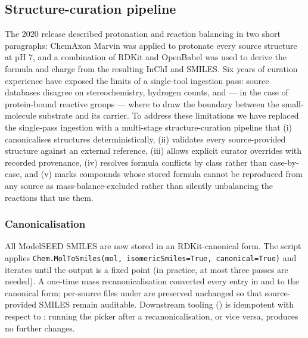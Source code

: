 \subsection{Structure-curation pipeline}\label{sec:structure-curation}

The 2020 release described protonation and reaction balancing in two short
paragraphs: ChemAxon Marvin was applied to protonate every source structure at
pH 7, and a combination of RDKit and OpenBabel was used to derive the formula
and charge from the resulting InChI and SMILES. Six years of curation
experience have exposed the limits of a single-tool ingestion pass: source
databases disagree on stereochemistry, hydrogen counts, and --- in the case of
protein-bound reactive groups --- where to draw the boundary between the
small-molecule substrate and its carrier. To address these limitations we have
replaced the single-pass ingestion with a multi-stage structure-curation
pipeline that (i) canonicalises structures deterministically, (ii) validates
every source-provided structure against an external reference, (iii) allows
explicit curator overrides with recorded provenance, (iv) resolves formula
conflicts by class rather than case-by-case, and (v) marks compounds whose
stored formula cannot be reproduced from any source as mass-balance-excluded
rather than silently unbalancing the reactions that use them.

\subsubsection{Canonicalisation}

All ModelSEED SMILES are now stored in an RDKit-canonical form. The
 script applies
\texttt{Chem.MolToSmiles(mol, isomericSmiles=True, canonical=True)} and iterates
until the output is a fixed point (in practice, at most three passes are
needed). A one-time mass recanonicalisation converted every entry in
 and
 to the canonical form; per-source files
under  are preserved
unchanged so that source-provided SMILES remain auditable. Downstream tooling
() is idempotent with
respect to : running the picker after a
recanonicalisation, or vice versa, produces no further changes.

